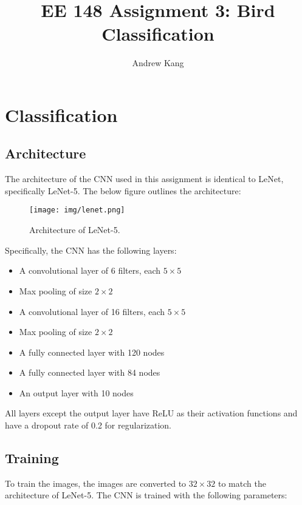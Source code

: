 \documentclass{article}
\begin{document}

\title{EE 148 Assignment 3: Bird Classification}
\date{}
\author{Andrew Kang}
\maketitle





\section{Classification}

\subsection{Architecture}
The architecture of the CNN used in this assignment is identical to LeNet, specifically LeNet-5. The below figure outlines the architecture:

\begin{figure}[ht]
\centering
\texttt{[image: img/lenet.png]}
\caption{Architecture of LeNet-5.}
\end{figure}

Specifically, the CNN has the following layers:

\begin{itemize}
    \item A convolutional layer of 6 filters, each $5 \times 5$
    \item Max pooling of size $2 \times 2$
    \item A convolutional layer of 16 filters, each $5 \times 5$
    \item Max pooling of size $2 \times 2$
    \item A fully connected layer with 120 nodes
    \item A fully connected layer with 84 nodes
    \item An output layer with 10 nodes
\end{itemize}

All layers except the output layer have ReLU as their activation functions and have a dropout rate of 0.2 for regularization.

\subsection{Training}
To train the images, the images are converted to $32 \times 32$ to match the architecture of LeNet-5. The CNN is trained with the following parameters:
\end{document}
